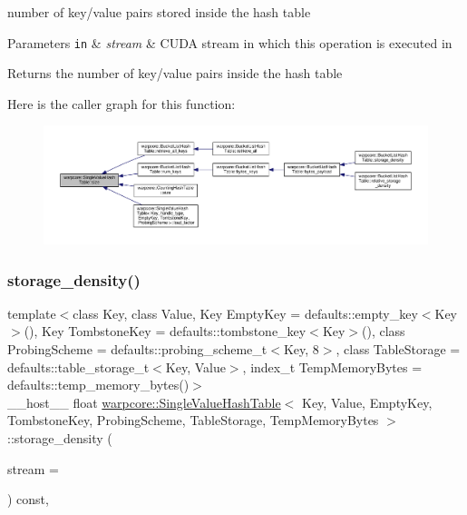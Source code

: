 number of key/value pairs stored inside the hash table 


\begin{DoxyParams}[1]{Parameters}
\mbox{\tt in}  & {\em stream} & C\+U\+DA stream in which this operation is executed in \\
\hline
\end{DoxyParams}
\begin{DoxyReturn}{Returns}
the number of key/value pairs inside the hash table 
\end{DoxyReturn}
Here is the caller graph for this function\+:
\nopagebreak
\begin{figure}[H]
\begin{center}
\leavevmode
\includegraphics[width=350pt]{classwarpcore_1_1SingleValueHashTable_a6c0e8d90665fe1eb9accf10256b57f28_icgraph}
\end{center}
\end{figure}
\mbox{\label{classwarpcore_1_1SingleValueHashTable_ac593bc68b452128ae4c6ce9217c5d333}} 
\subsubsection{\texorpdfstring{storage\+\_\+density()}{storage\_density()}}
{\footnotesize\ttfamily template$<$class Key, class Value, Key Empty\+Key = defaults\+::empty\+\_\+key$<$\+Key$>$(), Key Tombstone\+Key = defaults\+::tombstone\+\_\+key$<$\+Key$>$(), class Probing\+Scheme = defaults\+::probing\+\_\+scheme\+\_\+t$<$\+Key, 8$>$, class Table\+Storage = defaults\+::table\+\_\+storage\+\_\+t$<$\+Key, Value$>$, index\+\_\+t Temp\+Memory\+Bytes = defaults\+::temp\+\_\+memory\+\_\+bytes()$>$ \\
\+\_\+\+\_\+host\+\_\+\+\_\+ float \hyperlink{classwarpcore_1_1SingleValueHashTable}{warpcore\+::\+Single\+Value\+Hash\+Table}$<$ Key, Value, Empty\+Key, Tombstone\+Key, Probing\+Scheme, Table\+Storage, Temp\+Memory\+Bytes $>$\+::storage\+\_\+density (\begin{DoxyParamCaption}\item[{const cuda\+Stream\+\_\+t}]{stream = {} }\end{DoxyParamCaption}) const\hspace{0.3cm}{\ttfamily [inline]}, {\ttfamily [noexcept]}}



